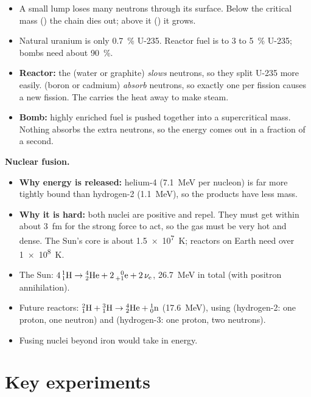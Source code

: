 \begin{itemize}
  \item A small lump loses many neutrons through its surface. Below the critical mass
        () the chain dies out; above it () it grows.
  \item Natural uranium is only \qty{0.7}{\percent} U-235. Reactor fuel is  to
        3 to \qty{5}{\percent} U-235; bombs need about \qty{90}{\percent}.
  \item \textbf{Reactor:} the  (water or graphite) \emph{slows} neutrons, so
        they split U-235 more easily.  (boron or cadmium) \emph{absorb}
        neutrons, so exactly one per fission causes a new fission. The  carries
        the heat away to make steam.
  \item \textbf{Bomb:} highly enriched fuel is pushed together into a supercritical mass.
        Nothing absorbs the extra neutrons, so the energy comes out in a fraction of a second.
\end{itemize}

\textbf{Nuclear fusion.}
\begin{itemize}
  \item \textbf{Why energy is released:} helium-4 (\qty{7.1}{MeV} per nucleon) is far more
        tightly bound than hydrogen-2 (\qty{1.1}{MeV}), so the products have less mass.
  \item \textbf{Why it is hard:} both nuclei are positive and repel. They must get within
        about \qty{3}{fm} for the strong force to act, so the gas must be very hot and dense.
        The Sun's core is about \qty{1.5e7}{K}; reactors on Earth need over \qty{1e8}{K}.
  \item The Sun: $4\,\chFourNuc{1}{1}{H} \to \chFourAlpha + 2\,\chFourPos + 2\,\chFourNu$,
        \qty{26.7}{MeV} in total (with positron annihilation).
  \item Future reactors: $\chFourNuc{2}{1}{H} + \chFourNuc{3}{1}{H} \to \chFourAlpha +
        \chFourNeut$ (\qty{17.6}{MeV}), using  (hydrogen-2: one proton, one
        neutron) and  (hydrogen-3: one proton, two neutrons).
  \item Fusing nuclei beyond iron would take in energy.
\end{itemize}

\section{Key experiments}\label{ch4:sec:experiments}

